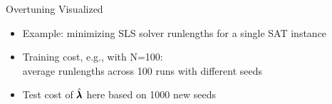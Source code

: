 \begin{frame}[fragile]{Overtuning Visualized}

\begin{itemize}
	\item Example: minimizing SLS solver runlengths for a single SAT instance
	\item \alert{Training cost}, e.g., with N=100:\\average runlengths across 100 runs with different seeds
	\item \alert{Test cost} of $\hat{\pmb{\lambda}}$ here based on 1000 new seeds 
\end{itemize}	

\pause


\begin{center}
\end{center}


\end{frame}

